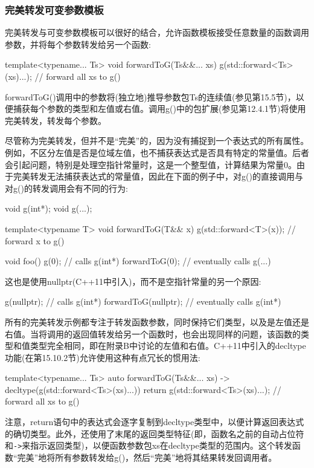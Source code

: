 \subsubsection{完美转发可变参数模板}

完美转发与可变参数模板可以很好的结合，允许函数模板接受任意数量的函数调用参数，并将每个参数转发给另一个函数:

\begin{cpp}
template<typename... Ts> void forwardToG(Ts&&... xs)
{
	g(std::forward<Ts>(xs)...); // forward all xs to g()
}
\end{cpp}

forwardToG()调用中的参数将(独立地)推导参数包Ts的连续值(参见第15.5节)，以便捕获每个参数的类型和左值或右值。调用g()中的包扩展(参见第12.4.1节)将使用完美转发，转发每个参数。

尽管称为完美转发，但并不是“完美”的，因为没有捕捉到一个表达式的所有属性。例如，不区分左值是否是位域左值，也不捕获表达式是否具有特定的常量值。后者会引起问题，特别是处理空指针常量时，这是一个整型值，计算结果为常量0。由于完美转发无法捕获表达式的常量值，因此在下面的例子中，对g()的直接调用与对g()的转发调用会有不同的行为:

\begin{cpp}
void g(int*);
void g(...);

template<typename T> void forwardToG(T&& x)
{
	g(std::forward<T>(x)); // forward x to g()
}

void foo()
{
	g(0); // calls g(int*)
	forwardToG(0); // eventually calls g(...)
}
\end{cpp}

这也是使用nullptr(C++11中引入)，而不是空指针常量的另一个原因:

\begin{cpp}
g(nullptr); // calls g(int*)
forwardToG(nullptr); // eventually calls g(int*)
\end{cpp}

所有的完美转发示例都专注于转发函数参数，同时保持它们类型，以及是左值还是右值。当将调用的返回值转发给另一个函数时，也会出现同样的问题，该函数的类型和值类型完全相同，即在附录B中讨论的左值和右值。C++11中引入的decltype功能(在第15.10.2节)允许使用这种有点冗长的惯用法:

\begin{cpp}
template<typename... Ts>
auto forwardToG(Ts&&... xs) -> decltype(g(std::forward<Ts>(xs)...))
{
	return g(std::forward<Ts>(xs)...); // forward all xs to g()
}
\end{cpp}

注意，return语句中的表达式会逐字复制到decltype类型中，以便计算返回表达式的确切类型。此外，还使用了末尾的返回类型特征(即，函数名之前的自动占位符和\texttt{->}来指示返回类型)，以便函数参数包xs在decltype类型的范围内。这个转发函数“完美”地将所有参数转发给g()，然后“完美”地将其结果转发回调用者。

